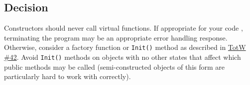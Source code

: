 \subsection{Decision}
Constructors should never call virtual functions. If appropriate for your code , terminating the program may be an appropriate error handling response. Otherwise, consider a factory function or \texttt{Init()} method as described in \hyperref[ch:tip-of-the-week-42]{TotW \#42}. Avoid \texttt{Init()} methods on objects with no other states that affect which public methods may be called (semi-constructed objects of this form are particularly hard to work with correctly).

